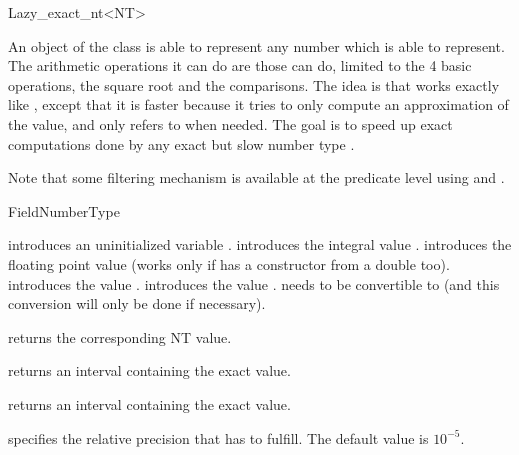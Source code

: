 
\begin{ccRefClass} {Lazy_exact_nt<NT>}
\label{lazy_exact_nt}

\ccDefinition
An object of the class  is able to represent any number
which  is able to represent.  The arithmetic operations it can do are
those  can do, limited to the 4 basic operations, the square root and
the comparisons.
The idea is that  works exactly like , except
that it is faster because it tries to only compute an approximation of the
value, and only refers to  when needed.  The goal is to speed up exact
computations done by any exact but slow number type .

Note that some filtering mechanism is available at the predicate level
using  and .


\ccIsModel
FieldNumberType

\ccCreation
{}

{introduces an uninitialized variable \ccVar.}
\ccGlue
{}
{introduces the integral value .}
\ccGlue
{}
{introduces the floating point value  (works only if  has a
constructor from a double too).}
\ccGlue
{}
{introduces the value .}
\ccGlue
{}
{introduces the value .  needs to be convertible to 
(and this conversion will only be done if necessary).}

\ccOperations

 {returns the corresponding NT value.}

 {returns an interval containing the
exact value.}

 {returns an interval containing the 
exact value.}

{specifies the relative precision that  has to fulfill.
The default value is $10^{-5}$.  }


\end{ccRefClass}
